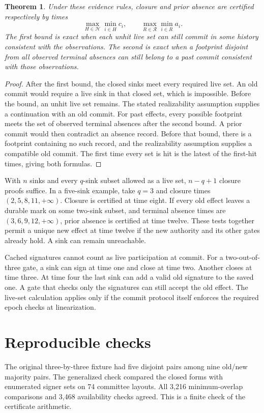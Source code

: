 \documentclass[11pt]{article}
\newtheorem{theorem}{Theorem}
\begin{document}
\begin{theorem}
Under these evidence rules, closure and prior absence are certified
respectively by times
\[
 \max_{H\in\mathcal H}\min_{i\in H}c_i,
 \qquad
 \max_{R\in\mathcal R}\min_{i\in R}a_i.
\]
The first bound is exact when each unhit live set can still
commit in some history consistent with the observations. The second
is exact when a footprint disjoint from all observed terminal absences
can still belong to a past commit consistent with those observations.
\end{theorem}
\begin{proof}
After the first bound, the closed sinks meet every required live set.
An old commit would require a live sink in that closed set, which is
impossible. Before the bound, an unhit live set remains. The stated
realizability assumption supplies a continuation with an old commit.
For past effects, every possible footprint meets the set of observed
terminal absences after the second bound. A prior commit would then
contradict an absence record. Before that bound, there is a footprint
containing no such record, and the realizability assumption supplies
a compatible old commit. The first time every set is hit is the latest
of the first-hit times, giving both formulas.
\end{proof}

With $n$ sinks and every $q$-sink subset allowed as a live set,
$n-q+1$ closure proofs suffice. In a five-sink example, take
$q=3$ and closure times $(2,5,8,11,+\infty)$. Closure is certified
at time eight. If every old effect leaves a durable mark on some
two-sink subset, and terminal absence times are $(3,6,9,12,+\infty)$,
prior absence is certified at time twelve. These tests together
permit a unique new effect at time twelve if the new authority
and its other gates already hold. A sink can remain unreachable.

Cached signatures cannot count as live participation at commit.
For a two-out-of-three gate, a sink can sign at time one and close
at time two. Another closes at time three. At time four the last
sink can add a valid old signature to the saved one. A gate that
checks only the signatures can still accept the old effect.
The live-set calculation applies only if the commit protocol
itself enforces the required epoch checks at linearization.

\section{Reproducible checks}
The original three-by-three fixture had five disjoint pairs
among nine old/new majority pairs. The generalized check
compared the closed forms with enumerated signer sets on 74
committee layouts. All 3,216 minimum-overlap comparisons and
3,468 availability checks agreed. This is a finite check of
the certificate arithmetic.
\end{document}
